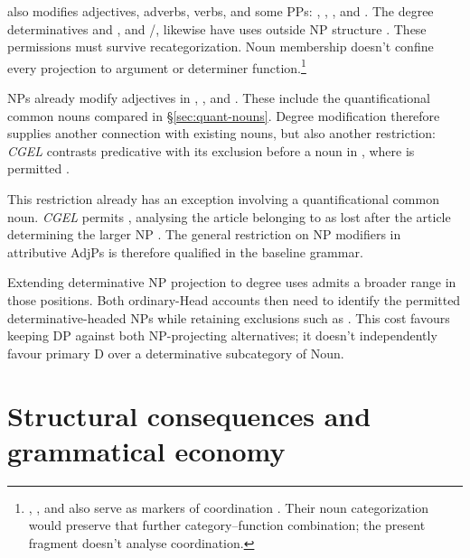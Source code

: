 \documentclass[12pt]{article}
\begin{document}
 also modifies adjectives, adverbs, verbs, and some PPs: , , , and  \citep[396--397]{huddleston2002}. The degree determinatives  and , and /, likewise have uses outside NP structure \citep[390, 395--397]{huddleston2002}. These permissions must survive recategorization. Noun membership doesn't confine every projection to argument or determiner function.\footnote{, , and  also serve as markers of coordination \citep[1305, 1308]{huddleston2002}. Their noun categorization would preserve that further category--function combination; the present fragment doesn't analyse coordination.}

NPs already modify adjectives in , , and  \citep[549--550]{huddleston2002}. These include the quantificational common nouns compared in §\ref{sec:quant-nouns}. Degree modification therefore supplies another connection with existing nouns, but also another restriction: \textit{CGEL} contrasts predicative  with its exclusion before a noun in , where  is permitted \citep[551--552]{huddleston2002}.

This restriction already has an exception involving a quantificational common noun. \textit{CGEL} permits , analysing the article belonging to  as lost after the article determining the larger NP \citep[p.~552, n.~8]{huddleston2002}. The general restriction on NP modifiers in attributive AdjPs is therefore qualified in the baseline grammar.

Extending determinative NP projection to degree uses admits a broader range in those positions. Both ordinary-Head accounts then need to identify the permitted determinative-headed NPs while retaining exclusions such as . This cost favours keeping DP against both NP-projecting alternatives; it doesn't independently favour primary D over a determinative subcategory of Noun.

\section{Structural consequences and grammatical economy}\label{sec:economy}
\end{document}
